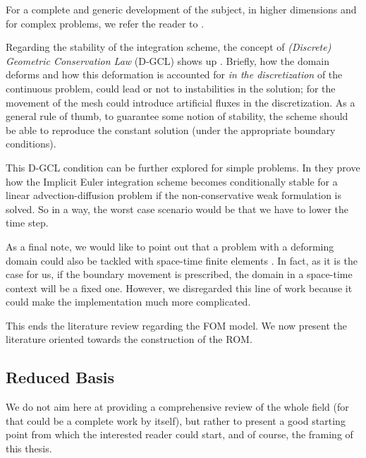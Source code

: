 For a complete and generic development of the subject,
in higher dimensions and for complex problems,
we refer the reader to 
\cite{doneaALE,
DONEA1982689}.

Regarding the stability of the integration scheme,
the concept of \textit{(Discrete) Geometric Conservation Law} (D-GCL) shows up 
\cite{HUGHES2000467,
GUILLARD20001467,
FARHAT2001669,
LESOINNE199671}.
Briefly, how the domain deforms and how this deformation is accounted for
\textit{in the discretization} of the continuous problem,
could lead or not to instabilities in the solution; 
for the movement of the mesh could introduce artificial fluxes in the discretization.
As a general rule of thumb, 
to guarantee some notion of stability,
the scheme should be able to reproduce the constant solution 
(under the appropriate boundary conditions).

This D-GCL condition can be further explored for simple problems.
In \cite{formaggiaALE} they prove how the Implicit Euler integration scheme
becomes conditionally stable for a linear advection-diffusion problem
if the non-conservative weak formulation is solved.
So in a way, the worst case scenario would be that we have to lower the time step.

As a final note, 
we would like to point out that a problem with a deforming domain
could also be tackled with \mbox{space-time} finite elements 
\cite{TEZDUYAR1992339}.
In fact, as it is the case for us, 
if the boundary movement is prescribed,
the domain in a \mbox{space-time} context will be a fixed one.
However, 
we disregarded this line of work because it could make the implementation much more complicated.

This ends the literature review regarding the FOM model.
We now present the literature oriented towards the construction of the ROM.

\subsection{Reduced Basis}
We do not aim here at providing a comprehensive review of the whole field
(for that could be a complete work by itself),
but rather to present a good starting point 
from which the interested reader could start, 
and of course, the framing of this thesis.

